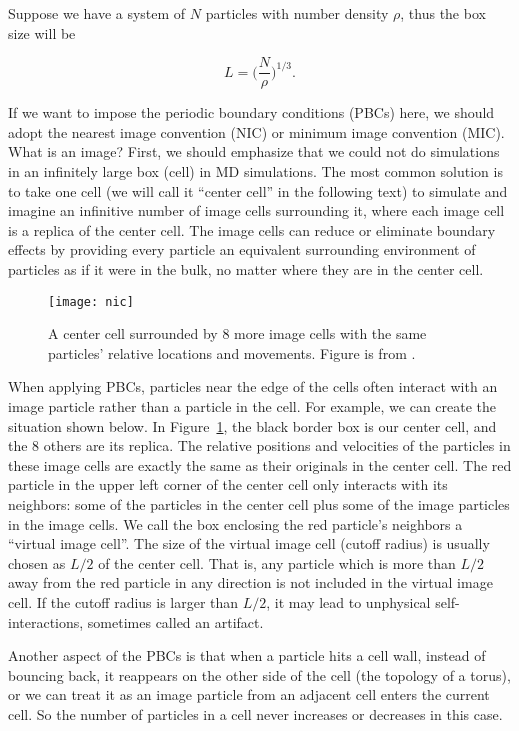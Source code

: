 \Answer
Suppose we have a system of $N$ particles with number density $\rho$, thus the
box size will be

\begin{equation}
    L = \bigg( \frac{ N }{ \rho } \bigg)^{1 / 3}.
\end{equation}

If we want to impose the periodic boundary conditions (PBCs) here, we should adopt the
nearest image convention (NIC) or minimum image convention (MIC). What is an image? First,
we should emphasize that we could not do simulations in an infinitely large box (cell) in MD
simulations. The most common solution is to take one cell (we will call it ``center cell''
in the following text) to simulate and imagine an infinitive number of image cells
surrounding it, where each image cell is a replica of the center cell. The image cells can
reduce or eliminate boundary effects by providing every particle an equivalent surrounding
environment of particles as if it were in the bulk, no matter where they are in the center
cell.

\begin{figure}[h]
    \centering
    \texttt{[image: nic]}
    \caption{A center cell surrounded by $8$ more image cells with the same
        particles' relative locations and movements. Figure is from \cite{matlab}.}
    \label{fig:nic}
\end{figure}

When applying PBCs, particles near the edge of the cells often interact
with an image particle rather than a particle in the cell. For example, we can create the
situation shown below.
In Figure~\ref{fig:nic}, the black border box is our center cell, and the $8$ others are
its replica. The relative positions and velocities of the particles in these image cells
are exactly the same as their originals in the center cell. The red particle in the
upper left corner of the center cell only interacts with its neighbors: some of the
particles in the center cell plus some of the image particles in the image cells.
We call the box enclosing the red particle's neighbors a ``virtual image cell''.
The size of the virtual image cell (cutoff radius) is usually chosen as $L / 2$
of the center cell. That is, any particle which is more than $L / 2$ away from the
red particle in any direction is not included in the virtual image cell.
If the cutoff radius is larger than $L / 2$, it may lead to
unphysical self-interactions, sometimes called an artifact.

Another aspect of the PBCs is that when a particle hits a cell wall, instead of bouncing
back, it reappears on the other side of the cell (the topology of a torus), or we can
treat it as an image particle from an adjacent cell enters the current cell.
So the number of particles in a cell never increases or decreases in this case.

